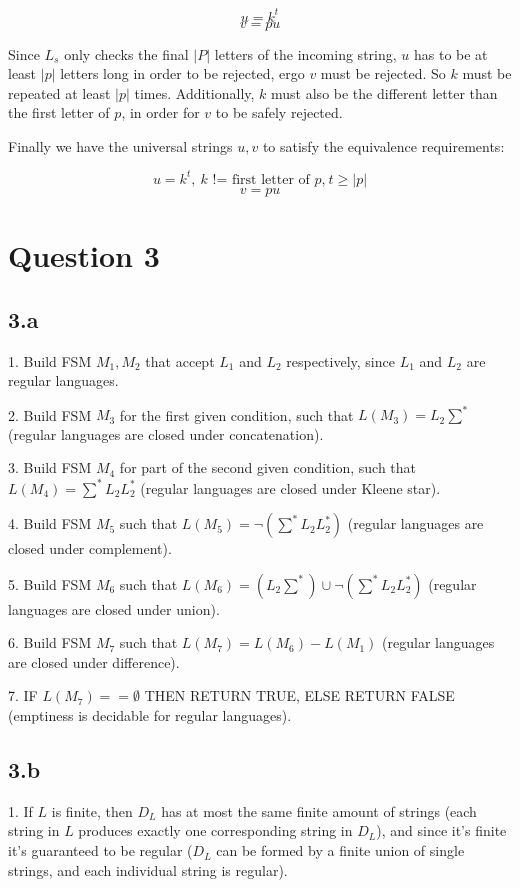 \documentclass{article}
\begin{document}
 $$u = k^t$$
 $$v = pu$$
 
Since $L_s$ only checks the final $|P|$ letters of the incoming string, $u$ has to be at least $|p|$ letters long in order to be rejected, ergo $v$ must be rejected. So $k$ must be repeated at least $|p|$ times. Additionally, $k$ must also be the different letter than the first letter of $p$, in order for $v$ to be safely rejected.
 
Finally we have the universal strings $u, v$ to satisfy the equivalence requirements:

 $$u = k^t, \: \text{$k$ != first letter of $p$,} \: t \geq |p|$$
 $$v = pu$$

 \section*{Question 3}
 
\subsection*{3.a}

1. Build FSM $M_1, M_2$ that accept $L_1$ and $L_2$ respectively, since $L_1$ and $L_2$ are regular languages.

2. Build FSM $M_3$ for the first given condition, such that $L(M_3) = L_2\sum^*$ (regular languages are closed under concatenation).

3. Build FSM $M_4$ for part of the second given condition, such that $L(M_4) = \sum^*L_2L_2^*$ (regular languages are closed under Kleene star).

4. Build FSM $M_5$ such that $L(M_5) = \neg(\sum^*L_2L_2^*)$ (regular languages are closed under complement).

5. Build FSM $M_6$ such that $L(M_6) = (L_2\sum^*)\cup \neg(\sum^*L_2L_2^*)$ (regular languages are closed under union).

6. Build FSM $M_7$ such that $L(M_7) = L(M_6) - L(M_1)$ (regular languages are closed under difference).

7. IF $L(M_7) == \emptyset$ THEN RETURN TRUE, ELSE RETURN FALSE (emptiness is decidable for regular languages).

\subsection*{3.b}

1. If $L$ is finite, then $D_L$ has at most the same finite amount of strings (each string in $L$ produces exactly one corresponding string in $D_L$), and since it's finite it's guaranteed to be regular ($D_L$ can be formed by a finite union of single strings, and each individual string is regular).
\end{document}
